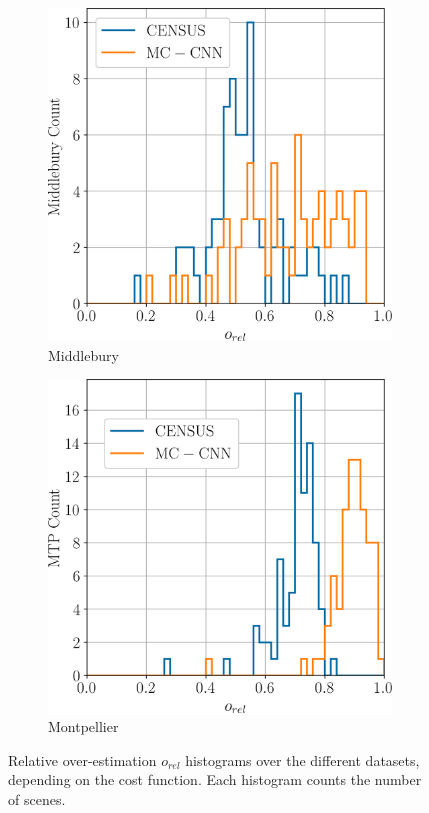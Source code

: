 \begin{figure}
    \centering
    \begin{subfigure}[t]{0.5\linewidth}
        \centering
        \includegraphics[width=\linewidth]{Images/Chap_5/histogram_o_rel_middlebury.png}
        \caption{Middlebury}
        \label{fig:o_rel_middlebury}
    \end{subfigure}\hfill
    \begin{subfigure}[t]{0.5\linewidth}
        \centering
        \includegraphics[width=\linewidth]{Images/Chap_5/histogram_o_rel_mtp.png}
        \caption{Montpellier}
        \label{fig:o_rel_mtp}
    \end{subfigure}
    \caption{Relative over-estimation $o_{rel}$ histograms over the different datasets, depending on the cost function. Each histogram counts the number of scenes.}
    \label{fig:o_rel_hist}
\end{figure}

